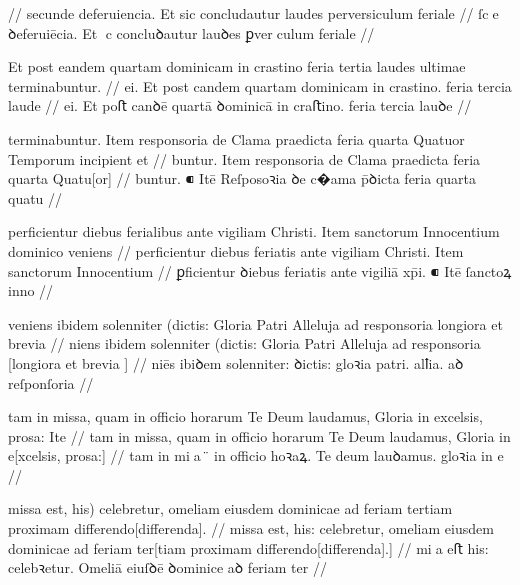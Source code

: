 \ex \bg
\gla
{}
{} {} {} {} {} {} {} {} {} {}
{} {} {} {} {} {} {} {} {} {}
//
\glRekonstrukcja
{} secunde deferuiencia. Et sic concludautur laudes perversiculum feriale
//
\glU
{}
ſce ꝺeferuiēcia. Et c concluꝺautur lauꝺes ꝑverculum feriale
//
\endgl
\xe



\ex \bg
\gla
{}
{} Et post eandem quartam dominicam in crastino feria tertia laudes
ultimae terminabuntur.
//
\glRekonstrukcja
{}
ei. Et post candem quartam dominicam in crastino. feria tercia laude
//
\glU
{}
ei. Et poﬅ canꝺē quartā ꝺominicā in craﬅino. feria tercia lauꝺe
//
\endgl
\xe




\ex \bg
\gla
{} terminabuntur.
{} Item responsoria de Clama praedicta feria quarta Quatuor Temporum
incipient et 
//
\glRekonstrukcja
{} \relax[termina]buntur.
{} Item responsoria de Clama praedicta feria quarta Quatu[or]
//
\glU
{}
buntur. ⁌ Itē Reſposoꝛia ꝺe c�ama p̄ꝺicta feria quarta quatu
//
\endgl
\xe



\ex \bg
\gla
{} perficientur diebus ferialibus ante vigiliam Christi.
{} Item sanctorum Innocentium dominico veniens
//
\glRekonstrukcja
{} perficientur diebus feriatis ante vigiliam Christi.
{} Item sanctorum Innocentium
//
\glU
{}
ꝑficientur ꝺiebus feriatis ante vigiliā xp̄i. ⁌ Itē ſanctoꝝ inno
//
\endgl
\xe

\ex \bg
\gla
{} veniens ibidem solenniter
(dictis: Gloria Patri Alleluja ad responsoria longiora et brevia 
//
\glRekonstrukcja
{} \relax[ve]niens ibidem solenniter
(dictis: Gloria Patri Alleluja ad responsoria [longiora et brevia ]
//
\glU
{}
niēs ibiꝺem solenniter: ꝺictis: gloꝛia patri. alꝉia. aꝺ reſponſoria   
//
\endgl
\xe



\ex \bg
\gla
{}
tam in
missa, quam in officio horarum Te Deum laudamus, Gloria in excelsis,
prosa: Ite
//
\glRekonstrukcja
{}
tam in
missa, quam in officio horarum Te Deum laudamus, Gloria in e[xcelsis,
prosa:] 
//
\glU
{}
tam in mia ̈ in oﬀicio hoꝛaꝝ. Te deum lauꝺamus. gloꝛia in e 
//
\endgl
\xe



\ex \bg
\gla
{} missa est, his) celebretur, omeliam eiusdem dominicae ad feriam
tertiam proximam differendo[differenda].
//
\glRekonstrukcja
{} missa est, his: celebretur, omeliam eiusdem dominicae ad feriam
ter[tiam proximam differendo[differenda].]
//
\glU
{}
mia eﬅ his: celebꝛetur. Omeliā eiuſꝺē ꝺominice aꝺ feriam ter  
//
\endgl
\xe

